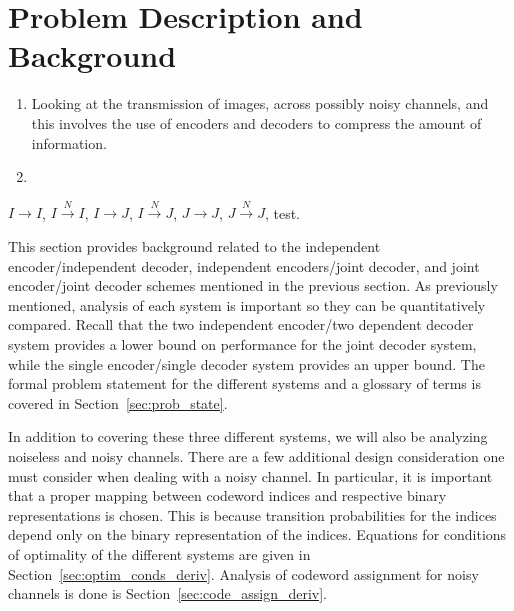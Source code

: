 \documentclass[10pt]{article}
\newcommand{\sysIIN}{\mbox{$I \overset{N}{\rightarrow} I$}}
\newcommand{\sysII}{\mbox{$I \rightarrow I$}}
\newcommand{\sysIJN}{\mbox{$I \overset{N}{\rightarrow} J$}}
\newcommand{\sysIJ}{\mbox{$I \rightarrow J$}}
\newcommand{\sysJJN}{\mbox{$J \overset{N}{\rightarrow} J$}}
\newcommand{\sysJJ}{\mbox{$J \rightarrow J$}}
\begin{document}
\section{Problem Description and Background}
\begin{enumerate}
    \item Looking at the transmission of images, across possibly noisy channels, and this involves the use of encoders and decoders to compress the amount of information.
    \item 

\end{enumerate}
\sysII, \sysIIN, \sysIJ, \sysIJN, \sysJJ, \sysJJN, test.


This section provides background related to the independent encoder/independent decoder, independent encoders/joint decoder, and joint encoder/joint decoder schemes mentioned in the previous section. As previously mentioned, analysis of each system is important so they can be quantitatively compared. Recall that the two independent encoder/two dependent decoder system provides a lower bound on performance for the joint decoder system, while the single encoder/single decoder system provides an upper bound. The formal problem statement for the different systems and a glossary of terms is covered in Section~\ref{sec:prob_state}.

In addition to covering these three different systems, we will also be analyzing noiseless and noisy channels. There are a few additional design consideration one must consider when dealing with a noisy channel. In particular, it is important that a proper mapping between codeword indices and respective binary representations is chosen. This is because transition probabilities for the indices depend only on the binary representation of the indices. Equations for conditions of optimality of the different systems are given in Section~\ref{sec:optim_conds_deriv}. Analysis of codeword assignment for noisy channels is done is Section~\ref{sec:code_assign_deriv}.
\end{document}
